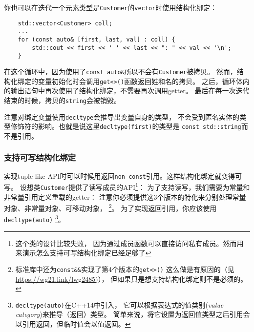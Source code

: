 你也可以在迭代一个元素类型是\texttt{Customer}的\texttt{vector}时使用结构化绑定：
\begin{lstlisting}
    std::vector<Customer> coll;
    ...
    for (const auto& [first, last, val] : coll) {
        std::cout << first << ' ' << last << ": " << val << '\n';
    }
\end{lstlisting}
在这个循环中，因为使用了\texttt{const auto\&}所以不会有\texttt{Customer}被拷贝。
然而，结构化绑定的变量初始化时会调用\texttt{get<>()}函数返回姓和名的拷贝。
之后，循环体内的输出语句中再次使用了结构化绑定，不需要再次调用getter。
最后在每一次迭代结束的时候，拷贝的\texttt{string}会被销毁。

注意对绑定变量使用\texttt{decltype}会推导出变量自身的类型，
不会受到匿名实体的类型修饰符的影响。也就是说这里\texttt{decltype(first)}的类型是
\texttt{const std::string}而不是引用。

\subsubsection{支持可写结构化绑定}
实现tuple-like API时可以时候用返回\texttt{non-const}引用。这样结构化绑定就变得可写。
设想类\texttt{Customer}提供了读写成员的API\footnote{这个类的设计比较失败，
因为通过成员函数可以直接访问私有成员。然而用来演示怎么支持可写结构化绑定已经足够了}：
为了支持读写，我们需要为常量和非常量引用定义重载的getter：
注意你必须提供这3个版本的特化来分别处理常量对象、非常量对象、可移动对象，
\footnote{标准库中还为\texttt{const\&\&}实现了第4个版本的\texttt{get<>()}
这么做是有原因的（见\url{https://wg21.link/lwg2485)}），
但如果只是想支持结构化绑定则不是必须的。}。
为了实现返回引用，你应该使用\texttt{decltype(auto)}
\footnote{\texttt{decltype(auto)}在C++14中引入，
它可以根据表达式的值类别(\emph{value category})来推导（返回）类型。
简单来说，将它设置为返回值类型之后引用会以引用返回，但临时值会以值返回。}。


